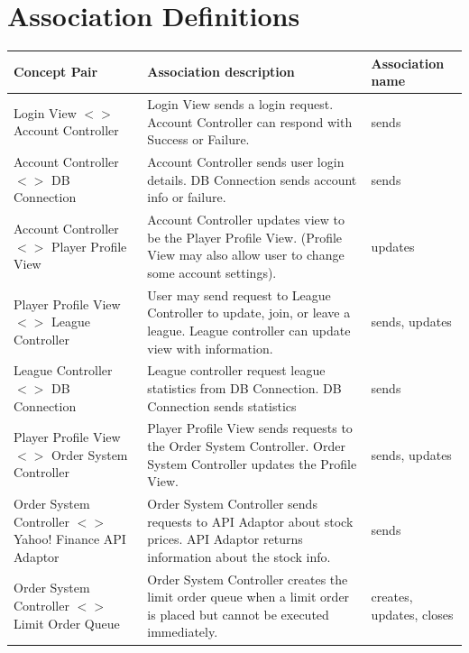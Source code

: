 \newpage
\section{Association Definitions}

\begin{centering}
\renewcommand\arraystretch{1.3}
\label{UC-3}
\begin{longtable}{|p{1.75in}| p{3in}| p{1.75in} |}
\hline
\bfseries{\color{color1}Concept Pair} &
          \bfseries{\color{color1}Association description} &
          \bfseries{\color{color1}Association name} \\ \hline

           Login View $<>$ Account Controller &
           Login View sends a login request. Account Controller can respond with Success
           or Failure. &
           sends \\ \hline

           Account Controller $<>$ DB Connection
           & Account Controller sends user login details. DB Connection sends account
           info or failure.
           & sends \\ \hline

           Account Controller $<>$ Player Profile View
           & Account Controller updates view to be the Player Profile View. (Profile
           View may also allow user to change some account settings).
           & updates \\ \hline

           Player Profile View $<>$ League Controller
           & User may send request to League Controller to update, join, or leave a league.
           League controller can update view with information.
           & sends, updates \\ \hline

           League Controller $<>$ DB Connection
           & League controller request league statistics from DB Connection. DB Connection
           sends statistics
           & sends \\ \hline

           Player Profile View $<>$ Order System Controller
           & Player Profile View sends requests to the Order System Controller.
           Order System Controller updates the Profile View.\
           & sends, updates \\ \hline

           Order System Controller $<>$ Yahoo! Finance API Adaptor
           & Order System Controller sends requests to API Adaptor about stock prices.
           API Adaptor returns information about the stock info.
           & sends \\ \hline

           Order System Controller $<>$ Limit Order Queue
           & Order System Controller creates the limit order queue when a limit order
           is placed but cannot be executed immediately.
           & creates, updates, closes\\ \hline

\end{longtable}
\end{centering}

